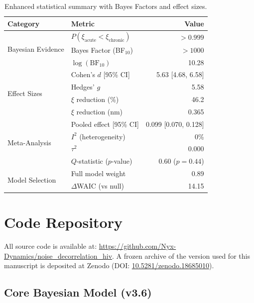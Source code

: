 \documentclass[11pt]{article}
\begin{document}
\begin{table}[htbp]
\centering
\caption{Enhanced statistical summary with Bayes Factors and effect sizes.}
\begin{tabular}{llr}
\toprule
\textbf{Category} & \textbf{Metric} & \textbf{Value} \\
\midrule
\multirow{3}{*}{Bayesian Evidence}
& $P(\xi_\text{acute} < \xi_\text{chronic})$ & $>0.999$ \\
& Bayes Factor (BF$_{10}$) & $>1000$ \\
& $\log(\text{BF}_{10})$ & 10.28 \\
\midrule
\multirow{4}{*}{Effect Sizes}
& Cohen's $d$ [95\% CI] & 5.63 [4.68, 6.58] \\
& Hedges' $g$ & 5.58 \\
& $\xi$ reduction (\%) & 46.2 \\
& $\xi$ reduction (nm) & 0.365 \\
\midrule
\multirow{4}{*}{Meta-Analysis}
& Pooled effect [95\% CI] & 0.099 [0.070, 0.128] \\
& $I^2$ (heterogeneity) & 0\% \\
& $\tau^2$ & 0.000 \\
& $Q$-statistic ($p$-value) & 0.60 ($p = 0.44$) \\
\midrule
\multirow{2}{*}{Model Selection}
& Full model weight & 0.89 \\
& $\Delta$WAIC (vs null) & 14.15 \\
\bottomrule
\end{tabular}
\end{table}

\clearpage
\section{Code Repository}
\label{sec:code}

All source code is available at: \url{https://github.com/Nyx-Dynamics/noise_decorrelation_hiv}. A frozen archive of the version used for this manuscript is deposited at Zenodo (DOI: \href{https://doi.org/10.5281/zenodo.18685010}{10.5281/zenodo.18685010}).

\subsection{Core Bayesian Model (v3.6)}
\end{document}
